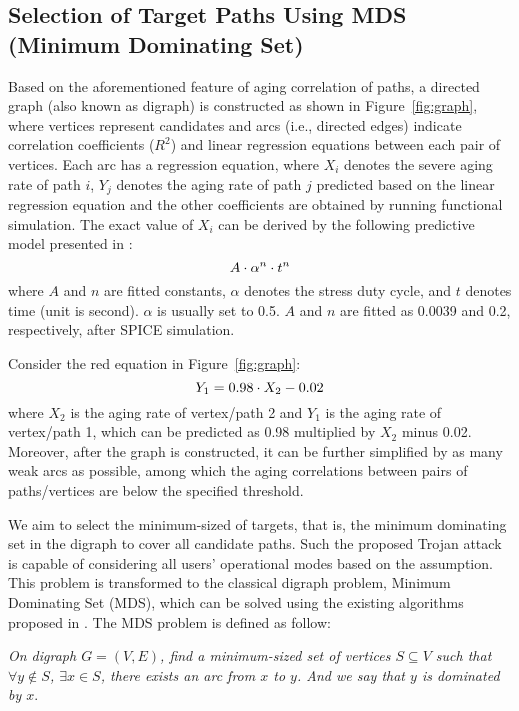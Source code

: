\subsection{Selection of Target Paths Using MDS (Minimum Dominating Set)}
\label{sec:frame:mds}
Based on the aforementioned feature of aging correlation of paths, a directed graph (also known as digraph) is constructed as shown in Figure~\ref{fig:graph}, where vertices represent candidates and arcs (i.e., directed edges) indicate correlation coefficients ($R^2$) and linear regression equations between each pair of vertices. Each arc has a regression equation, where $X_{i}$ denotes the severe aging rate of path $i$, $Y_{j}$ denotes the aging rate of path $j$ predicted based on the linear regression equation and the other coefficients are obtained by running functional simulation. The exact value of $X_{i}$ can be derived by the following predictive model presented in \cite{wang2007efficient}:
\begin{equation}
	\fontsize{8}{8} \selectfont
	A \cdot \alpha^n \cdot t^n 
	\label{eq:worst}
\end{equation}
where $A$ and $n$ are fitted constants, $\alpha$ denotes the stress duty cycle, and $t$ denotes time (unit is second). $\alpha$ is usually set to 0.5. $A$ and $n$ are fitted as 0.0039 and 0.2, respectively, after SPICE simulation.

Consider the red equation in Figure~\ref{fig:graph}:
\begin{equation}
	\centering
	\fontsize{8}{8} \selectfont
	Y_{1} = 0.98 \cdot X_{2} - 0.02
\end{equation}
where $X_{2}$ is the aging rate of vertex/path 2 and $Y_{1}$ is the aging rate of vertex/path 1, which can be predicted as 0.98 multiplied by $X_{2}$ minus 0.02.
Moreover, after the graph is constructed, it can be further simplified by as many weak arcs as possible, among which the aging correlations between pairs of paths/vertices are below the specified threshold.

We aim to select the minimum-sized of targets, that is, the minimum dominating set in the digraph to cover all candidate paths. Such the proposed Trojan attack is capable of considering all users' operational modes based on the assumption. This problem is transformed to the classical digraph problem, Minimum Dominating Set (MDS), which can be solved using the existing algorithms proposed in \cite{ore1962theory}\cite{natarajan1978optimum}. The MDS problem is defined as follow:

\textit{On digraph $G = (V, E)$, find a minimum-sized set of vertices $S \subseteq V$ such that $\forall y \notin S$, $\exists x \in S$, there exists an arc from $x$ to $y$. And we say that $y$ is dominated by $x$}.

